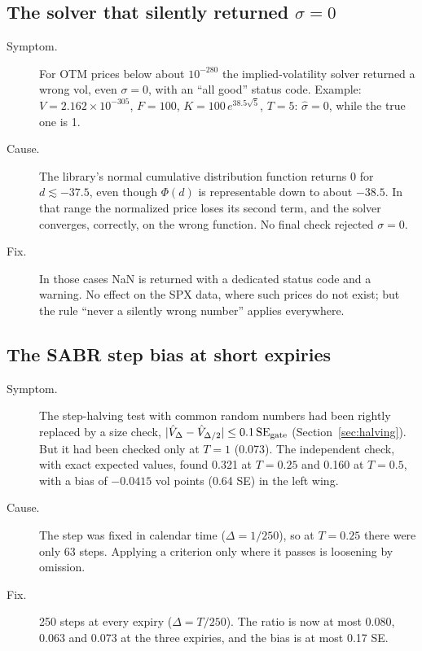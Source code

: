 \subsection{\texorpdfstring{The solver that silently returned $\sigma=0$}{The solver that silently returned sigma = 0}}
\begin{description}
\item[Symptom.] For OTM prices below about $10^{-280}$ the implied-volatility solver returned a wrong vol, even
$\sigma=0$, with an ``all good'' status code. Example: $V=2.162\times10^{-305}$, $F=100$, $K=100\,e^{38.5\sqrt5}$,
$T=5$: $\hat\sigma=0$, while the true one is 1.
\item[Cause.] The library's normal cumulative distribution function returns 0 for $d\lesssim-37.5$, even though
$\Phi(d)$ is representable down to about $-38.5$. In that range the normalized price loses its second term, and the
solver converges, correctly, on the wrong function. No final check rejected $\sigma=0$.
\item[Fix.] In those cases NaN is returned with a dedicated status code and a warning. No effect on the SPX data, where
such prices do not exist; but the rule ``never a silently wrong number'' applies everywhere.
\end{description}

\subsection{The SABR step bias at short expiries}
\begin{description}
\item[Symptom.] The step-halving test with common random numbers had been rightly replaced by a size check,
$|\hat V_\Delta-\hat V_{\Delta/2}|\le0.1\,\mathrm{SE}_{\text{gate}}$ (Section~\ref{sec:halving}). But it had been checked only
at $T=1$ (0.073). The independent check, with exact expected values, found 0.321 at $T=0.25$ and 0.160 at $T=0.5$,
with a bias of $-0.0415$ vol points (0.64 SE) in the left wing.
\item[Cause.] The step was fixed in calendar time ($\Delta=1/250$), so at $T=0.25$ there were only 63 steps. Applying
a criterion only where it passes is loosening by omission.
\item[Fix.] 250 steps at every expiry ($\Delta=T/250$). The ratio is now at most 0.080, 0.063 and 0.073 at the three
expiries, and the bias is at most 0.17 SE.
\end{description}

